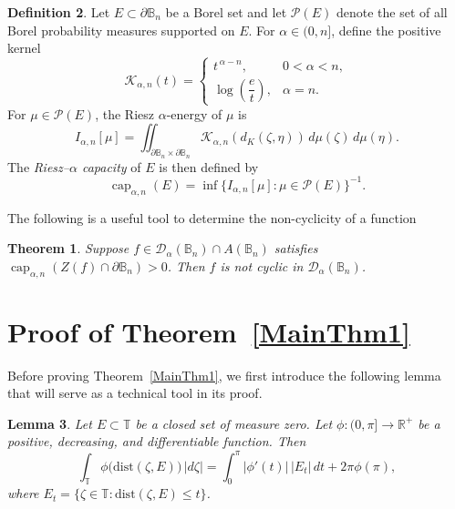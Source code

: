 \documentclass[a4paper,12pt]{amsart}
\newtheorem{thm}{Theorem}
\newtheorem{lem}[thm]{Lemma}
\theoremstyle{definition}
\newtheorem{defn}[thm]{Definition}
\theoremstyle{remark}
\def\Bn{\mathbb{B}_n}
\begin{document}
\begin{defn}
Let $E \subset \mathbb \partial \Bn$ be a Borel set and let $\mathcal P(E)$ denote the set of all
Borel probability measures supported on $E$.  
For $\alpha \in (0,n]$, define the positive kernel
\begin{equation*}
    \mathcal{K}_{\alpha,n}(t) =
    \begin{cases}
        t^{\,\alpha - n}, & 0 < \alpha < n,\\[4pt]
        \log \!\left(\dfrac{e}{t}\right), & \alpha = n.
    \end{cases}
\end{equation*}
For $\mu \in \mathcal P(E)$, the Riesz $\alpha$-energy of $\mu$ is
\begin{equation*}
    I_{\alpha,n}[\mu]
    =
    \iint_{\mathbb \partial \Bn \times \partial \Bn} \mathcal{K}_{\alpha,n}\!\left( d_K(\zeta,\eta) \right)
    \, d\mu(\zeta)\, d\mu(\eta).
\end{equation*}
The \emph{Riesz--$\alpha$ capacity} of $E$ is then defined by
\begin{equation*}    
    \operatorname{cap}_{\alpha,n}(E)
    =
    {\inf \{ I_{\alpha,n}[\mu] : \mu \in \mathcal P(E) \}^{-1}}.
\end{equation*}

The following is a useful tool to determine the non-cyclicity of a function

\begin{thm} {\cite[Theorem~4.4]{sola2014notedirichlettypespacescyclic}} \label{thm:cap_noncyclic}
    Suppose $f \in \mathcal{D}_{\alpha}(\Bn) \cap A(\Bn)$ satisfies $\operatorname{cap}_{\alpha,n}(Z(f) \cap \partial \Bn) > 0$. 
    Then $f$ is not cyclic in $\mathcal{D}_\alpha(\Bn)$.
\end{thm}

\end{defn}


\section{Proof of Theorem~{\ref{MainThm1}}} \label{Section3}

Before proving Theorem~\ref{MainThm1}, we first introduce the following lemma that will serve as a technical tool in its proof.

\begin{lem} {\cite[Exercise~{9.4.1}]{ElFallah2014_book}} \label{lem:book_exercise}
Let $E \subset \mathbb{T}$ be a closed set of measure zero.  
Let $\phi : (0, \pi] \to \mathbb{R}^+$ be a positive, decreasing, and differentiable function.  
Then
\begin{equation*}
    \int_{\mathbb{T}} \phi\big(\mathrm{dist}(\zeta, E)\big)\, |d\zeta|
    = \int_0^{\pi} |\phi'(t)|\, |E_t|\, dt + 2\pi \phi(\pi),
\end{equation*}
where $E_t = \{\zeta \in \mathbb{T} : \mathrm{dist}(\zeta, E) \leq t\}$.
\end{lem}
\end{document}
